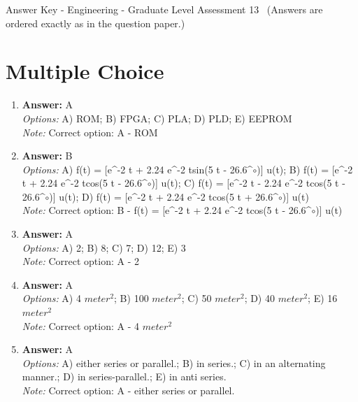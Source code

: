 \documentclass[12pt]{article}
\begin{document}
\begin{center}
Answer Key - Engineering - Graduate Level Assessment 13 \
\small (Answers are ordered exactly as in the question paper.)
\end{center}

\section*{Multiple Choice}
\begin{enumerate}[label=\arabic*.]
\item \textbf{Answer:} A
\\ \textit{Options:} A) ROM; B) FPGA; C) PLA; D) PLD; E) EEPROM
\\ \textit{Note:} Correct option: A - ROM
\item \textbf{Answer:} B
\\ \textit{Options:} A) f(t) = [e^-2 t + 2.24 e^-2 tsin(5 t - 26.6^\ensuremath{\circ})] u(t); B) f(t) = [e^-2 t + 2.24 e^-2 tcos(5 t - 26.6^\ensuremath{\circ})] u(t); C) f(t) = [e^-2 t - 2.24 e^-2 tcos(5 t - 26.6^\ensuremath{\circ})] u(t); D) f(t) = [e^-2 t + 2.24 e^-2 tcos(5 t + 26.6^\ensuremath{\circ})] u(t)
\\ \textit{Note:} Correct option: B - f(t) = [e^-2 t + 2.24 e^-2 tcos(5 t - 26.6^\ensuremath{\circ})] u(t)
\item \textbf{Answer:} A
\\ \textit{Options:} A) 2; B) 8; C) 7; D) 12; E) 3
\\ \textit{Note:} Correct option: A - 2
\item \textbf{Answer:} A
\\ \textit{Options:} A) 4 $meter^2$; B) 100 $meter^2$; C) 50 $meter^2$; D) 40 $meter^2$; E) 16 $meter^2$
\\ \textit{Note:} Correct option: A - 4 $meter^2$
\item \textbf{Answer:} A
\\ \textit{Options:} A) either series or parallel.; B) in series.; C) in an alternating manner.; D) in series-parallel.; E) in anti series.
\\ \textit{Note:} Correct option: A - either series or parallel.
\end{enumerate}
\end{document}
